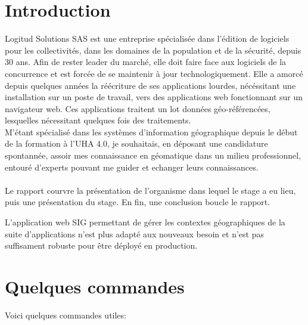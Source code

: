 \documentclass{rapportUHA40}
\begin{document}

\tabledematieres%



\section{Introduction}
Logitud Solutions SAS est une entreprise spécialisée dans l'édition de
logiciels pour les collectivités, dans les domaines de la population et de la
sécurité, depuis 30 ans. Afin de rester leader du marché, elle doit faire face
aux logiciels de la concurrence et est forcée de se maintenir à jour
technologiquement. Elle a amorcé depuis quelques années la réécriture de ses
applications lourdes, nécéssitant une installation sur un poste de travail,
vers des applications web fonctionnant sur un navigateur web. Ces applications
traitent un lot données géo-référencées, lesquelles nécessitant quelques fois
des traitements. \\

M'étant spécialisé dans les systèmes d'information géographique depuis le début
de la formation à l'UHA 4.0, je souhaitais, en déposant une candidature
spontannée, assoir mes connaissance en géomatique dans un milieu professionnel,
entouré d'experts pouvant me guider et echanger leurs connaissances. \\\\

Le rapport courvre la présentation de l'organisme dans lequel le stage a eu
lieu, puis une présentation du stage. En fin, une conclusion boucle le rapport.

L'application web SIG permettant de gérer les contextes géographiques de la
suite d'applications n'est plus adapté aux nouveaux besoin et n'est pas
suffisament robuste pour être déployé en production.


\section{Quelques commandes}

Voici quelques commandes utiles:

\end{document}
